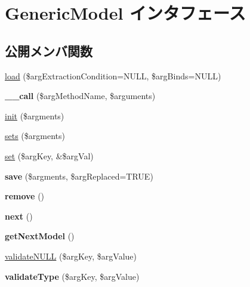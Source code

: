 \hypertarget{interface_generic_model}{}\section{Generic\+Model インタフェース}
\label{interface_generic_model}
\subsection*{公開メンバ関数}
\begin{DoxyCompactItemize}
\item 
\hyperlink{interface_generic_model_a90039d90147a9fb38497b33d58dc12ba}{load} (\$arg\+Extraction\+Condition=N\+U\+L\+L, \$arg\+Binds=N\+U\+L\+L)
\item 
\hypertarget{interface_generic_model_a8da2c3ad88d448caf8382a12d5ae2e96}{}{\bfseries \+\_\+\+\_\+call} (\$arg\+Method\+Name, \$arguments)\label{interface_generic_model_a8da2c3ad88d448caf8382a12d5ae2e96}

\item 
\hyperlink{interface_generic_model_a53908907ddafb2d29ac69b1f380e3d59}{init} (\$argments)
\item 
\hyperlink{interface_generic_model_a7efef4c325056b9d526ac683f3497742}{sets} (\$argments)
\item 
\hyperlink{interface_generic_model_a1ec1f9b2e0f0cf79380527515d3ed4af}{set} (\$arg\+Key, \&\$arg\+Val)
\item 
\hypertarget{interface_generic_model_a43a20c6074b1e4dec12e09ae2f820a90}{}{\bfseries save} (\$argments, \$arg\+Replaced=T\+R\+U\+E)\label{interface_generic_model_a43a20c6074b1e4dec12e09ae2f820a90}

\item 
\hypertarget{interface_generic_model_a4d9140f501b646fbd0b9f5e82bffb4b1}{}{\bfseries remove} ()\label{interface_generic_model_a4d9140f501b646fbd0b9f5e82bffb4b1}

\item 
\hypertarget{interface_generic_model_a4715ba3e6fd86438e890a45520f35b14}{}{\bfseries next} ()\label{interface_generic_model_a4715ba3e6fd86438e890a45520f35b14}

\item 
\hypertarget{interface_generic_model_adb29e397e851eb533fdfab33e5c6acd8}{}{\bfseries get\+Next\+Model} ()\label{interface_generic_model_adb29e397e851eb533fdfab33e5c6acd8}

\item 
\hyperlink{interface_generic_model_a2e4d756ae215ca1257f53adb1d561541}{validate\+N\+U\+L\+L} (\$arg\+Key, \$arg\+Value)
\item 
\hypertarget{interface_generic_model_ae876a50aff0779fc2973f0177b3da00f}{}{\bfseries validate\+Type} (\$arg\+Key, \$arg\+Value)\label{interface_generic_model_ae876a50aff0779fc2973f0177b3da00f}


\end{DoxyCompactItemize}
